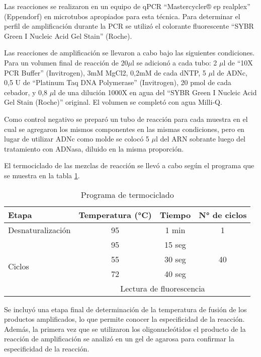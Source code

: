 Las reacciones se realizaron en un equipo de qPCR ``Mastercycler® ep realplex'' (Eppendorf) en microtubos apropiados para esta técnica. 
Para determinar el perfil de amplificación durante la PCR se utilizó el colorante fluorescente ``SYBR Green I Nucleic Acid Gel Stain'' (Roche).

Las reacciones de amplificación se llevaron a cabo bajo las siguientes condiciones.
Para un volumen final de reacción de 20$\mu$l se adicionó a cada tubo: 2 $\mu$l de ``10X PCR Buffer'' (Invitrogen), 3mM MgCl2, 0,2mM de cada dNTP, 5 $\mu$l de ADNc, 0,5 U de ``Platinum Taq DNA Polymerase'' (Invitrogen), 20 pmol de cada cebador, y 0,8 $\mu$l de una dilución 1000X en agua del ``SYBR Green I Nucleic Acid Gel Stain (Roche)'' original.
El volumen se completó con agua Milli-Q.

Como control negativo se preparó un tubo de reacción para cada muestra en el cual se agregaron los mismos componentes en las mismas condiciones, pero en lugar de utilizar ADNc como molde se colocó 5 $\mu$l del ARN sobrante luego del tratamiento con ADNasa, diluido en la misma proporción.

El termociclado de las mezclas de reacción se llevó a cabo según el programa que se muestra en la tabla \ref{table:termociclado}.


\begin{table}[!htbp]
\centering
\small
\caption{Programa de termociclado}
\label{table:termociclado}
\begin{tabular}{|l|c|c|c|}
\hline
Etapa                   & Temperatura (°C) & Tiempo & N° de ciclos        \\ \hline
Desnaturalización       & 95               & 1 min  & 1                   \\ \hline
\multirow{4}{*}{Ciclos} & 95               & 15 seg & \multirow{3}{*}{40} \\ \cline{2-3}
                        & 55               & 30 seg &                     \\ \cline{2-3}
                        & 72               & 40 seg &                     \\ \cline{2-4} 
                        & \multicolumn{3}{c|}{Lectura de fluorescencia}   \\ \hline
\end{tabular}
\end{table}

Se incluyó una etapa final de determinación de la temperatura de fusión de los productos amplificados, lo que permite conocer la especificidad de la reacción. 
Además, la primera vez que se utilizaron los oligonucleótidos el producto de la reacción de amplificación se analizó en un gel de agarosa para confirmar la especificidad de la reacción.

